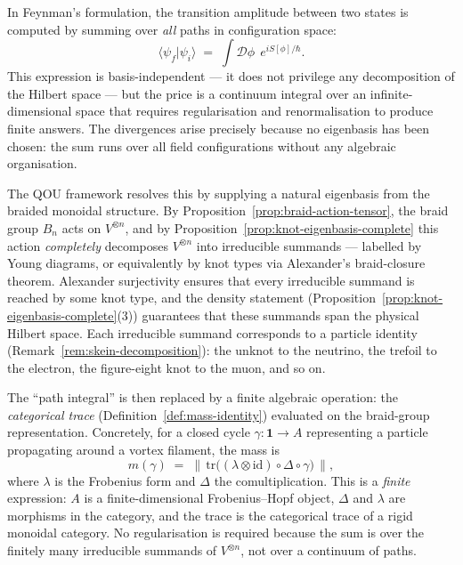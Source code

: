 \begin{remark}
\label{rem:feynman-eigenbasis}
In Feynman's formulation, the transition amplitude between two states is
computed by summing over \emph{all} paths in configuration space:
\[
  \langle\psi_f|\psi_i\rangle
  \;=\;
  \int \mathcal{D}\phi\;\,e^{iS[\phi]/\hbar}.
\]
This expression is basis-independent --- it does not privilege any
decomposition of the Hilbert space --- but the price is a
continuum integral over an infinite-dimensional space that requires
regularisation and renormalisation to produce finite answers.  The
divergences arise precisely because no eigenbasis has been chosen: the sum
runs over all field configurations without any algebraic organisation.

The QOU framework resolves this by supplying a natural eigenbasis from the
braided monoidal structure.  By
Proposition~\ref{prop:braid-action-tensor}, the braid group $B_n$ acts on
$V^{\otimes n}$, and by
Proposition~\ref{prop:knot-eigenbasis-complete} this action
\emph{completely} decomposes $V^{\otimes n}$ into irreducible summands ---
labelled by Young diagrams, or equivalently by knot types via Alexander's
braid-closure theorem.  Alexander surjectivity ensures that every
irreducible summand is reached by some knot type, and the density statement
(Proposition~\ref{prop:knot-eigenbasis-complete}(3)) guarantees that these
summands span the physical Hilbert space.  Each irreducible summand
corresponds to a particle identity
(Remark~\ref{rem:skein-decomposition}): the unknot to the neutrino, the
trefoil to the electron, the figure-eight knot to the muon, and so on.

The ``path integral'' is then replaced by a finite algebraic operation:
the \emph{categorical trace}
(Definition~\ref{def:mass-identity}) evaluated on the braid-group
representation.  Concretely, for a closed cycle
$\gamma \colon \mathbf{1} \to A$ representing a particle propagating
around a vortex filament, the mass is
\[
  m(\gamma)
  \;=\;
  \bigl\lVert\,
  \mathrm{tr}\bigl(
    (\lambda \otimes \mathrm{id})
    \circ \Delta
    \circ \gamma
  \bigr)
  \,\bigr\rVert,
\]
where $\lambda$ is the Frobenius form and $\Delta$ the comultiplication.
This is a \emph{finite} expression: $A$ is a finite-dimensional
Frobenius--Hopf object, $\Delta$ and $\lambda$ are morphisms in the
category, and the trace is the categorical trace of a rigid monoidal
category.  No regularisation is required because the sum is over the
finitely many irreducible summands of $V^{\otimes n}$, not over a
continuum of paths.


\end{remark}
